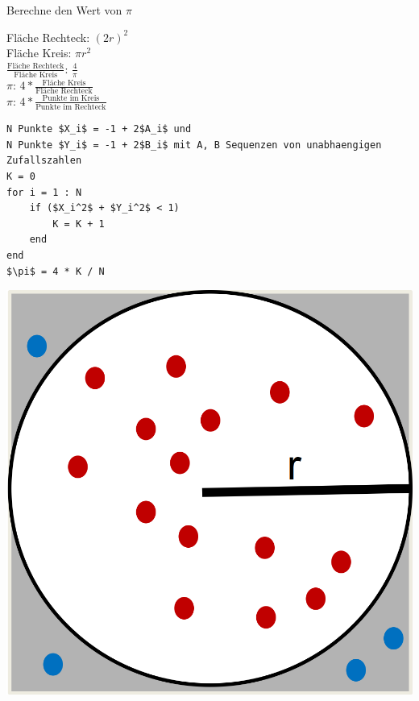 \begin{example}
	Berechne den Wert von $\pi$
	\begin{multicols}{5}
		Fläche Rechteck: $(2r)^2$ \\
		Fläche Kreis: $\pi r^2$ \\
		$\frac{\text{Fläche Rechteck}}{\text{Fläche Kreis}}$: $\frac{4}{\pi}$ \\
		$\pi$: $4 * \frac{\text{Fläche Kreis}}{\text{Fläche Rechteck}}$ \\
		$\pi$: $4 * \frac{\text{Punkte im Kreis}}{\text{Punkte im Rechteck}}$	
	\end{multicols}
	\begin{minipage}[h]{0.825\textwidth}
		\begin{lstlisting}[mathescape=true, tabsize=2]
N Punkte $X_i$ = -1 + 2$A_i$ und
N Punkte $Y_i$ = -1 + 2$B_i$ mit A, B Sequenzen von unabhaengigen Zufallszahlen
K = 0
for i = 1 : N
	if ($X_i^2$ + $Y_i^2$ < 1)
		K = K + 1
	end
end
$\pi$ = 4 * K / N
		\end{lstlisting}
	\end{minipage}
	\begin{minipage}[h]{0.175\textwidth}
		\includegraphics[width=1\textwidth]{pictures/montecarlopi}
	\end{minipage}
\end{example}

